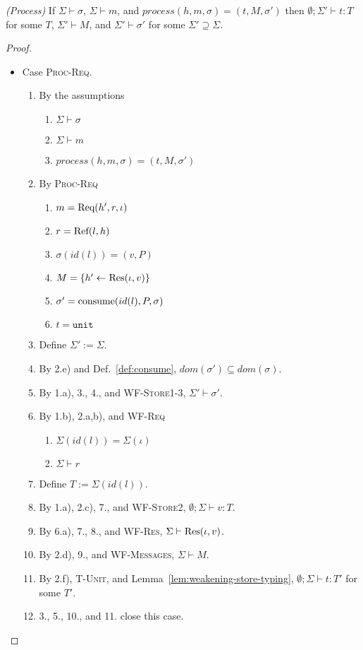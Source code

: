 \begin{lem}\emph{(Process)}\label{lem:process}
If $\Sigma \vdash \sigma$, $\Sigma \vdash m$, and $process(h, m, \sigma) = (t, M, \sigma')$ then $\emptyset ; \Sigma' \vdash t : T$ for some $T$, $\Sigma' \vdash M$, and $\Sigma' \vdash \sigma'$ for some $\Sigma' \supseteq \Sigma$.
\end{lem}
\begin{proof}
\begin{itemize}
\item Case \textsc{Proc-Req}.
\begin{enumerate}
\item By the assumptions
  \begin{enumerate}[label=(\alph*)]
  \item $\Sigma \vdash \sigma$
  \item $\Sigma \vdash m$
  \item $process(h, m, \sigma) = (t, M, \sigma')$
  \end{enumerate}
\item By \textsc{Proc-Req}
  \begin{enumerate}[label=(\alph*)]
  \item $m = {\textrm{Req}(h', r, \iota)}$
  \item $r = {\textrm{Ref}(l, h)}$
  \item $\sigma(id(l)) = (v, P)$
  \item $M = \{ h' \leftarrow {\textrm{Res}(\iota, v)} \}$
  \item $\sigma' = {\textrm{consume}(id(l), P, \sigma)}$
  \item $t = \texttt{unit}$
  \end{enumerate}
\item Define $\Sigma' := \Sigma$.
\item By 2.e) and Def.~\ref{def:consume}, $dom(\sigma') \subseteq dom(\sigma)$.
\item By 1.a), 3., 4., and \textsc{WF-Store1-3}, $\Sigma' \vdash \sigma'$.
\item By 1.b), 2.a,b), and \textsc{WF-Req}
  \begin{enumerate}[label=(\alph*)]
  \item $\Sigma(id(l)) = \Sigma(\iota)$
  \item $\Sigma \vdash r$
  \end{enumerate}
\item Define $T := \Sigma(id(l))$.
\item By 1.a), 2.c), 7., and \textsc{WF-Store2}, $\emptyset ; \Sigma \vdash v : T$.
\item By 6.a), 7., 8., and \textsc{WF-Res}, $\Sigma \vdash {\textrm{Res}(\iota, v)}$.
\item By 2.d), 9., and \textsc{WF-Messages}, $\Sigma \vdash M$.
\item By 2.f), \textsc{T-Unit}, and Lemma~\ref{lem:weakening-store-typing}, $\emptyset ; \Sigma \vdash t : T'$ for some $T'$.
\item 3., 5., 10., and 11. close this case.
\end{enumerate}


\end{itemize}
\end{proof}
